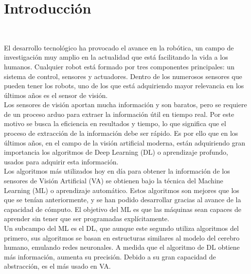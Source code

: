 \chapter{Introducción}
\label{cap:capitulo1}
\setcounter{page}{1}

\begin{flushright}
\begin{minipage}[]{10cm}
\end{minipage}\\

\end{flushright}

\vspace{1cm}

El desarrollo tecnológico ha provocado el avance en la robótica, un campo de investigación muy amplio en la actualidad que está facilitando la vida a los humanos. Cualquier robot está formado por tres componentes principales: un sistema de control, sensores y actuadores. Dentro de los numerosos sensores que pueden tener los robots, uno de los que está adquiriendo mayor relevancia en los últimos años es el sensor de visión.\\

Los sensores de visión aportan mucha información y son baratos, pero se requiere de un proceso arduo para extraer la información útil en tiempo real. Por este motivo se busca la eficiencia en resultados y tiempo, lo que significa que el proceso de extracción de la información debe ser rápido. Es por ello que en los últimos años, en el campo de la visión artificial moderna, están adquiriendo gran importancia los algoritmos de Deep Learning (DL) o aprendizaje profundo, usados para adquirir esta información.\\

Los algoritmos más utilizados hoy en día para obtener la información de los sensores de Visión Artificial (VA) se obtienen bajo la técnica del Machine Learning (ML) o aprendizaje automático. Estos algoritmos son mejores que los que se tenían anteriormente, y se han podido desarrollar gracias al avance de la capacidad de cómputo. El objetivo del ML es que las máquinas sean capaces de aprender sin tener que ser programadas explícitamente.\\

Un subcampo del ML es el DL, que aunque este segundo utiliza algoritmos del primero, sus algoritmos se basan en estructuras similares al modelo del cerebro humano, emulando redes neuronales. A medida que el algoritmo de DL obtiene más información, aumenta su precisión. Debido a su gran capacidad de abstracción, es el más usado en VA.\\


